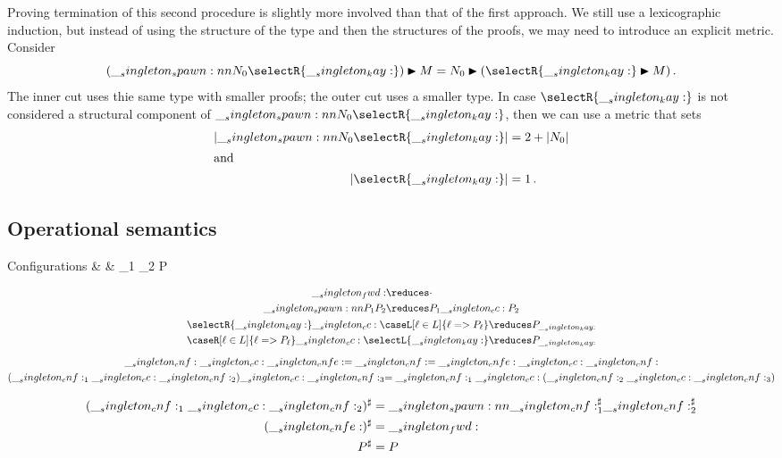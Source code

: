 Proving termination of this second procedure is slightly more involved than that of the first approach.
We still use a lexicographic induction, but instead of using the structure of the type and then the structures of the proofs, we may need to introduce an explicit metric.
Consider
\begin{equation*}
  \nspawn{(\spawn{N_0}{\selectR{\kay}})}{M}
    = \nspawn{N_0}{(\nspawn{\selectR{\kay}}{M})} \,.
\end{equation*}
The inner cut uses thie same type with smaller proofs; the outer cut uses a smaller type.
In case $\selectR{\kay}$ is not considered a structural component of $\spawn{N_0}{\selectR{\kay}}$, then we can use a metric that sets
\begin{align*}
  \lvert \spawn{N_0}{\selectR{\kay}} \rvert &= 2 + \lvert N_0 \rvert \\
\shortintertext{and}
  \lvert \selectR{\kay} \rvert &= 1 \,.
\end{align*}


\subsection{Operational semantics}

\begin{syntax*}
  Configurations & \cnf & \cnf_1 \cc \cnf_2 \mid \cnfe \mid P
\end{syntax*}

\begin{equation*}
  \begin{gathered}
    \!\begin{aligned}
      \fwd &\reduces \cdot \\
      \spawn{P_1}{P_2} &\reduces P_1 \cc P_2
    \end{aligned} \\
    \selectR{\kay} \cc \caseL[\ell \in L]{\ell => P_{\ell}}
      \reduces P_{\kay} \\
    \caseR[\ell \in L]{\ell => P_{\ell}} \cc \selectL{\kay}
      \reduces P_{\kay}
    \\[2\jot]
    \cnf \cc \cnfe = \cnf = \cnfe \cc \cnf \\
    (\cnf_1 \cc \cnf_2) \cc \cnf_3 = \cnf_1 \cc (\cnf_2 \cc \cnf_3)
  \end{gathered}
\end{equation*}

\begin{equation*}
  \begin{aligned}
    (\__singleton_cnf:_1 \__singleton_cc: \__singleton_cnf:_2)^\sharp &= \__singleton_spawn:nn {\__singleton_cnf:_1^\sharp} {\__singleton_cnf:_2^\sharp} \\
    (\__singleton_cnfe:)^\sharp &= \__singleton_fwd: \\
    P^\sharp &= P
  \end{aligned}
\end{equation*}




